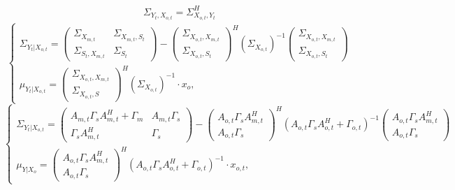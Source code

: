 \documentclass[11pt]{article}
\begin{document}
\begin{gather}
\Sigma_{Y_t,X_{o,t}}
= \Sigma_{X_{o,t},Y_t}^H
\end{gather}
\begin{equation}
\left\{ \begin{gathered} 
\Sigma_{Y_t|X_{o,t}} = \begin{pmatrix}
\Sigma_{X_{m,t}}&\Sigma_{X_{m,t}, S_t}\\
\Sigma_{S_t, X_{m,t}}&\Sigma_{S_t}
\end{pmatrix}-\begin{pmatrix}
\Sigma_{X_{o,t},X_{m,t}}\\
\Sigma_{X_{o,t},S_t}
\end{pmatrix}^H(\Sigma_{X_{o,t}})^{-1}\begin{pmatrix}
\Sigma_{X_{o,t},X_{m,t}}\\
\Sigma_{X_{o,t},S_t}
\end{pmatrix} \\
\mu_{Y_t|X_{o,t}} =   \begin{pmatrix}
\Sigma_{X_{o,t},X_{m,t}}\\
\Sigma_{X_{o,t},S}
\end{pmatrix}^H(\Sigma_{X_{o,t}})^{-1}\cdot x_o,
\end{gathered} \right.
\end{equation}
\begin{equation}
\left\{ \begin{gathered} 
\Sigma_{Y_t|X_{o,t}} = \begin{pmatrix}
A_{m,t} \Gamma_s A_{m,t}^H + \Gamma_m&A_{m,t} \Gamma_s\\
\Gamma_s A_{m,t}^H&\Gamma_s
\end{pmatrix}- \begin{pmatrix}
A_{o,t}\Gamma_s A_{m,t}^H\\
A_{o,t}\Gamma_s
\end{pmatrix}^H(A_{o,t}\Gamma_sA_{o,t}^H+\Gamma_{o,t})^{-1} \begin{pmatrix}
A_{o,t}\Gamma_s A_{m,t}^H\\
A_{o,t}\Gamma_s
\end{pmatrix} \\
\mu_{Y|X_o} =   \begin{pmatrix}
A_{o,t}\Gamma_s A_{m,t}^H\\
A_{o,t}\Gamma_s
\end{pmatrix}^H(A_{o,t}\Gamma_sA_{o,t}^H+\Gamma_{o,t})^{-1}\cdot x_{o,t},
\end{gathered} \right.
\end{equation}
\end{document}
